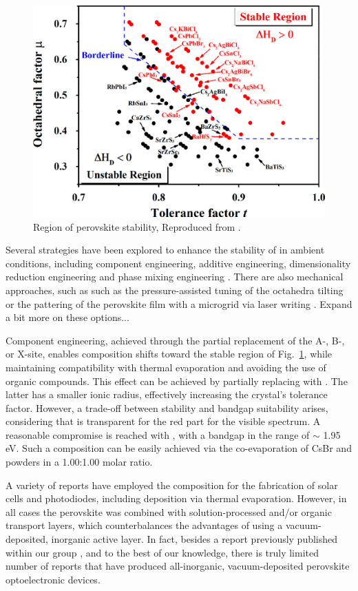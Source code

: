 \begin{figure}[htbp]
  \centering
  \medskip
  \includegraphics[width=.67\textwidth]{chapters/introduction/image/perovskite_stability.jpeg}
  \caption[Short caption for Table of Figures]{Region of perovskite stability, Reproduced from \cite{Sun2017ThermodynamicPerovskites}.}
  \label{fig:ch2:perovskite_stable_region}
\end{figure}

Several strategies have been explored to enhance the stability of in ambient conditions, including component engineering, additive engineering, dimensionality reduction engineering and phase mixing engineering \cite{Lei2024StabilityPerovskites}. There are also mechanical approaches, such as such as the pressure-assisted tuning of the  octahedra tilting \cite{Ke2021PreservingTilt} or the pattering of the perovskite film with a  microgrid via laser writing \cite{Steele2022AnFilms}. Expand a bit more on these options...

Component engineering, achieved through the partial replacement of the A-, B-, or X-site, enables composition shifts toward the stable region of Fig.~\ref{fig:ch2:perovskite_stable_region}, while maintaining compatibility with thermal evaporation and avoiding the use of organic compounds. This effect can be achieved by partially replacing  with . The latter has a smaller ionic radius, effectively increasing the crystal's tolerance factor. However, a trade-off between stability and bandgap suitability arises, considering that  is transparent for the red part for the visible spectrum. A reasonable compromise is reached with , with a bandgap in the range of $\sim$ 1.95 eV. Such a composition can be easily achieved via the co-evaporation of CsBr and  powders in a 1.00:1.00 molar ratio. 


A variety of reports have employed the  composition for the fabrication of solar cells and photodiodes, including deposition via thermal evaporation. However, in all cases the perovskite was combined with solution-processed and/or organic transport layers, which counterbalances the advantages of using a vacuum-deposited, inorganic active layer. In fact, besides a report previously published within our group \cite{PintorMonroy2021All-EvaporatedApplications}, and to the best of our knowledge, there is truly limited number of reports that have produced all-inorganic, vacuum-deposited perovskite optoelectronic devices. 



